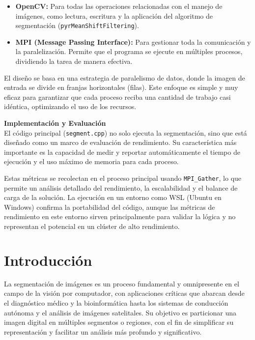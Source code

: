 \documentclass[fleqn,10pt]{article}
\begin{document}
\begin{itemize}
    \item \textbf{OpenCV:} Para todas las operaciones relacionadas con el manejo de imágenes, como lectura, escritura y la aplicación del algoritmo de segmentación (\texttt{pyrMeanShiftFiltering}).
    \item \textbf{MPI (Message Passing Interface):} Para gestionar toda la comunicación y la paralelización. Permite que el programa se ejecute en múltiples procesos, dividiendo la tarea de manera efectiva.
\end{itemize}

El diseño se basa en una estrategia de paralelismo de datos, donde la imagen de entrada se divide en franjas horizontales (filas). Este enfoque es simple y muy eficaz para garantizar que cada proceso reciba una cantidad de trabajo casi idéntica, optimizando el uso de los recursos.

\vspace{0.5cm}
\noindent\textbf{Implementación y Evaluación}\\
El código principal (\texttt{segment.cpp}) no solo ejecuta la segmentación, sino que está diseñado como un marco de evaluación de rendimiento. Su característica más importante es la capacidad de medir y reportar automáticamente el tiempo de ejecución y el uso máximo de memoria para cada proceso.

Estas métricas se recolectan en el proceso principal usando \texttt{MPI\_Gather}, lo que permite un análisis detallado del rendimiento, la escalabilidad y el balance de carga de la solución. La ejecución en un entorno como WSL (Ubuntu en Windows) confirma la portabilidad del código, aunque las métricas de rendimiento en este entorno sirven principalmente para validar la lógica y no representan el potencial en un clúster de alto rendimiento.

\clearpage
\section{Introducción}
La segmentación de imágenes es un proceso fundamental y omnipresente en el campo de la visión por computador, con aplicaciones críticas que abarcan desde el diagnóstico médico y la bioinformática hasta los sistemas de conducción autónoma y el análisis de imágenes satelitales. Su objetivo es particionar una imagen digital en múltiples segmentos o regiones, con el fin de simplificar su representación y facilitar un análisis más profundo y significativo.
\end{document}
